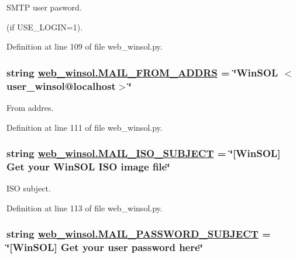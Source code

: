 SMTP user pasword. 

(if USE\_\-LOGIN=1). 

Definition at line 109 of file web\_\-winsol.py.\hypertarget{namespaceweb__winsol_e64c609c73aa1864d87fbdaac4d96394}{
\subsubsection[MAIL\_\-FROM\_\-ADDRS]{\setlength{\rightskip}{0pt plus 5cm}string \hyperlink{namespaceweb__winsol_e64c609c73aa1864d87fbdaac4d96394}{web\_\-winsol.MAIL\_\-FROM\_\-ADDRS} = \char`\"{}Win\-SOL $<$user\_\-winsol@localhost$>$\char`\"{}}}
\label{namespaceweb__winsol_e64c609c73aa1864d87fbdaac4d96394}


From addres. 



Definition at line 111 of file web\_\-winsol.py.\hypertarget{namespaceweb__winsol_a7122e806fc2a3a079c37b508f83f7dc}{
\subsubsection[MAIL\_\-ISO\_\-SUBJECT]{\setlength{\rightskip}{0pt plus 5cm}string \hyperlink{namespaceweb__winsol_a7122e806fc2a3a079c37b508f83f7dc}{web\_\-winsol.MAIL\_\-ISO\_\-SUBJECT} = \char`\"{}\mbox{[}Win\-SOL\mbox{]} Get your Win\-SOL ISO image file\char`\"{}}}
\label{namespaceweb__winsol_a7122e806fc2a3a079c37b508f83f7dc}


ISO subject. 



Definition at line 113 of file web\_\-winsol.py.\hypertarget{namespaceweb__winsol_e1b6763da828ac9eccd1dcba187f226e}{
\subsubsection[MAIL\_\-PASSWORD\_\-SUBJECT]{\setlength{\rightskip}{0pt plus 5cm}string \hyperlink{namespaceweb__winsol_e1b6763da828ac9eccd1dcba187f226e}{web\_\-winsol.MAIL\_\-PASSWORD\_\-SUBJECT} = \char`\"{}\mbox{[}Win\-SOL\mbox{]} Get your user password here\char`\"{}}}
\label{namespaceweb__winsol_e1b6763da828ac9eccd1dcba187f226e}


